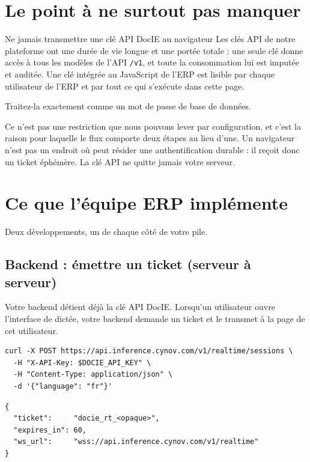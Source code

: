 \documentclass[11pt,a4paper]{article}
\begin{document}
\section{Le point à ne surtout pas manquer}

\begin{dontbox}{Ne jamais transmettre une clé API DocIE au navigateur}
Les clés API de notre plateforme ont une durée de vie longue et une portée totale : une
seule clé donne accès à tous les modèles de l'API \texttt{/v1}, et toute la consommation
lui est imputée et auditée. Une clé intégrée au JavaScript de l'ERP est lisible par
chaque utilisateur de l'ERP et par tout ce qui s'exécute dans cette page.\par\smallskip
Traitez-la exactement comme un mot de passe de base de données.
\end{dontbox}

Ce n'est pas une restriction que nous pouvons lever par configuration, et c'est la raison
pour laquelle le flux comporte deux étapes au lieu d'une. Un navigateur n'est pas un
endroit où peut résider une authentification durable : il reçoit donc un ticket éphémère.
La clé API ne quitte jamais votre serveur.

\section{Ce que l'équipe ERP implémente}
\label{sec:erp}

Deux développements, un de chaque côté de votre pile.

\subsection{Backend : émettre un ticket (serveur à serveur)}

Votre backend détient déjà la clé API DocIE. Lorsqu'un utilisateur ouvre l'interface de
dictée, votre backend demande un ticket et le transmet à la page de cet utilisateur.

\begin{lstlisting}
curl -X POST https://api.inference.cynov.com/v1/realtime/sessions \
  -H "X-API-Key: $DOCIE_API_KEY" \
  -H "Content-Type: application/json" \
  -d '{"language": "fr"}'
\end{lstlisting}

\begin{lstlisting}
{
  "ticket":     "docie_rt_<opaque>",
  "expires_in": 60,
  "ws_url":     "wss://api.inference.cynov.com/v1/realtime"
}
\end{lstlisting}
\end{document}
